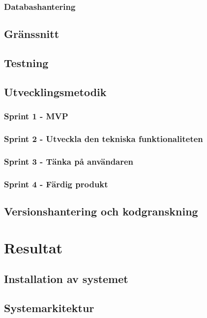 \documentclass[a4paper,12pt,oneside,final]{extbook}
\begin{document}
\subsection{Databashantering}

\section{Gränssnitt}

\section{Testning}

\section{Utvecklingsmetodik}

\subsection{Sprint 1 - MVP}

\subsection{Sprint 2 - Utveckla den tekniska funktionaliteten}

\subsection{Sprint 3 - Tänka på användaren}

\subsection{Sprint 4 - Färdig produkt}

\section{Versionshantering och kodgranskning}

\chapter{Resultat}

\section{Installation av systemet}

\section{Systemarkitektur}
\end{document}
